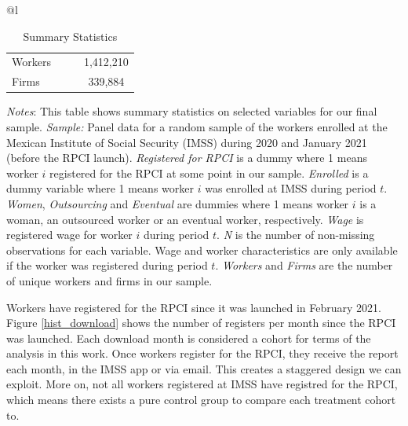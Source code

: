 \documentclass[10pt, oneside]{book}
\begin{document}
\begin{table}[H]
\footnotesize
\centering
\begin{threeparttable}
\centering
\caption{Summary Statistics\label{tab:summary_stats_rpci}}

\begin{tabular}[t]{@{}l}
\toprule
\toprule
\begin{tabular}[t]{lccc}

\midrule
Workers & & & 1,412,210\\
Firms & & & 339,884\\
\end{tabular}

\tabularnewline 
\bottomrule
\bottomrule

\end{tabular}

\begin{tablenotes}
\setlength{}
\scriptsize
\item \textit{Notes}: This table shows summary statistics on selected variables for our final sample. \textit{Sample:} Panel data for a random sample of the workers enrolled at the Mexican Institute of Social Security (IMSS) during 2020 and January 2021 (before the RPCI launch). \textit{Registered for RPCI} is a dummy where 1 means worker $i$ registered for the RPCI at some point in our sample. \textit{Enrolled} is a dummy variable where 1 means worker $i$ was enrolled at IMSS during period $t$. \textit{Women}, \textit{Outsourcing} and \textit{Eventual} are dummies where 1 means worker $i$ is a woman, an outsourced worker or an eventual worker, respectively. \textit{Wage} is registered wage for worker $i$ during period $t$. \textit{N} is the number of non-missing observations for each variable. Wage and worker characteristics are only available if the worker was registered during period $t$. \textit{Workers} and \textit{Firms} are the number of unique workers and firms in our sample. %
\end{tablenotes}
\end{threeparttable}
\end{table}

Workers have registered for the RPCI since it was launched in February 2021. Figure \ref{hist_download} shows the number of registers per month since the RPCI was launched. Each download month is considered a cohort for terms of the analysis in this work. Once workers register for the RPCI, they receive the report each month, in the IMSS app or via email. This creates a staggered design we can exploit. More on, not all workers registered at IMSS have registred for the RPCI, which means there exists a pure control group to compare each treatment cohort to.  \\
\end{document}
